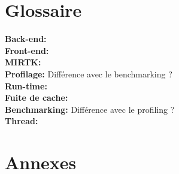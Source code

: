 \documentclass[10pt]{report}
\begin{document}
\chapter*{Glossaire}
\noindent
\textbf{Back-end:}\\ 
\textbf{Front-end:}\\
\textbf{MIRTK:}\\
\textbf{Profilage:} Différence avec le benchmarking ?\\
\textbf{Run-time:}\\
\textbf{Fuite de cache:}\\
\textbf{Benchmarking:} Différence avec le profiling ?\\
\textbf{Thread:}\\


\chapter*{Annexes}
\end{document}
